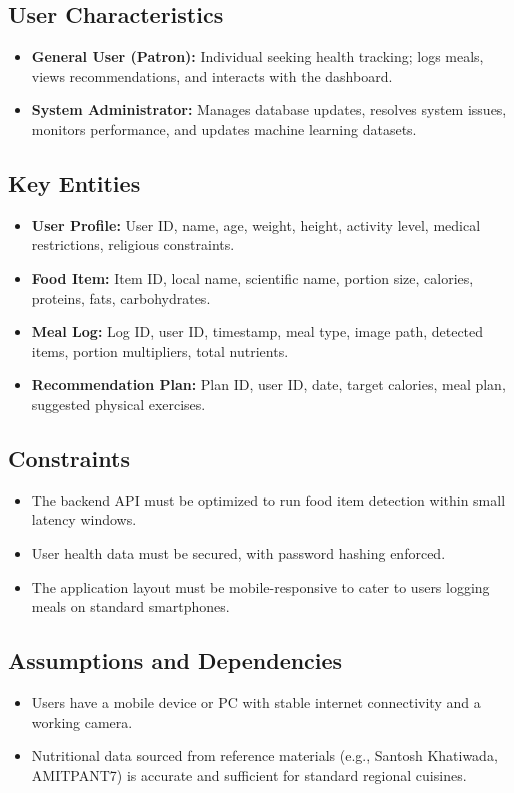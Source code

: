 \documentclass[11pt,a4paper]{article}
\begin{document}
\subsection{User Characteristics}
\begin{itemize}[leftmargin=*]
  \item \textbf{General User (Patron):} Individual seeking health tracking; logs meals, views recommendations, and interacts with the dashboard.
  \item \textbf{System Administrator:} Manages database updates, resolves system issues, monitors performance, and updates machine learning datasets.
\end{itemize}

\subsection{Key Entities}
\begin{itemize}[leftmargin=*]
  \item \textbf{User Profile:} User ID, name, age, weight, height, activity level, medical restrictions, religious constraints.
  \item \textbf{Food Item:} Item ID, local name, scientific name, portion size, calories, proteins, fats, carbohydrates.
  \item \textbf{Meal Log:} Log ID, user ID, timestamp, meal type, image path, detected items, portion multipliers, total nutrients.
  \item \textbf{Recommendation Plan:} Plan ID, user ID, date, target calories, meal plan, suggested physical exercises.
\end{itemize}

\subsection{Constraints}
\begin{itemize}[leftmargin=*]
  \item The backend API must be optimized to run food item detection within small latency windows.
  \item User health data must be secured, with password hashing enforced.
  \item The application layout must be mobile-responsive to cater to users logging meals on standard smartphones.
\end{itemize}

\subsection{Assumptions and Dependencies}
\begin{itemize}[leftmargin=*]
  \item Users have a mobile device or PC with stable internet connectivity and a working camera.
  \item Nutritional data sourced from reference materials (e.g., Santosh Khatiwada, AMITPANT7) is accurate and sufficient for standard regional cuisines.
\end{itemize}
\end{document}
